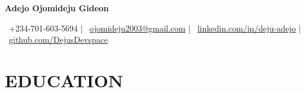 \documentclass[11pt,a4paper]{article}
\begin{document}
\pagecolor{pagecolor}

\begin{center}

    \begin{minipage}{\dimexpr\textwidth-2\fboxsep}
        \centering
        \vspace{8pt}
        {\Huge\bfseries Adejo Ojomideju Gideon}

        \vspace{4pt}
            {\small
            \faMobile\ +234-701-603-5694 |
            \faEnvelope\ \href{mailto:ojomideju2003@gmail.com}{ojomideju2003@gmail.com} |
            \faLinkedin\ \href{https://linkedin.com/in/deju-adejo}{linkedin.com/in/deju-adejo} | \\
            \faGithub\ \href{https://github.com/DejusDevspace}{github.com/DejusDevspace}
            }
            \vspace{8pt}
    \end{minipage}

\end{center}

\vspace{-12pt}



\section{EDUCATION}
\end{document}

